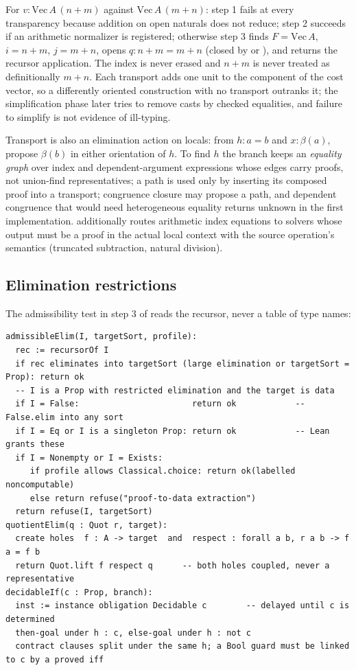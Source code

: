 For $v : \mathrm{Vec}\,A\,(n+m)$ against $\mathrm{Vec}\,A\,(m+n)$: step 1 fails at every transparency because addition on open naturals does not reduce; step 2 succeeds if an arithmetic normalizer is registered; otherwise step 3 finds $F = \mathrm{Vec}\,A$, $i = n+m$, $j = m+n$, opens $q : n+m = m+n$ (closed by  or ), and returns the recursor application. The index is never erased and $n+m$ is never treated as definitionally $m+n$. Each transport adds one unit to the  component of the cost vector, so a differently oriented construction with no transport outranks it; the simplification phase later tries to remove casts by checked equalities, and failure to simplify is not evidence of ill-typing.

Transport is also an elimination action on locals: from $h : a = b$ and $x : \beta(a)$, propose $\beta(b)$ in either orientation of $h$. To find $h$ the branch keeps an \emph{equality graph} over index and dependent-argument expressions whose edges carry proofs, not union-find representatives; a path is used only by inserting its composed proof into a transport; congruence closure may propose a path, and dependent congruence that would need heterogeneous equality returns unknown in the first implementation.  additionally routes arithmetic index equations to solvers whose output must be a proof in the actual local context with the source operation's semantics (truncated subtraction, natural division).

\subsection{Elimination restrictions}\label{alg:elim-restrictions}

The admissibility test in step 3 of  reads the recursor, never a table of type names:

\begin{lstlisting}
admissibleElim(I, targetSort, profile):
  rec := recursorOf I
  if rec eliminates into targetSort (large elimination or targetSort = Prop): return ok
  -- I is a Prop with restricted elimination and the target is data
  if I = False:                       return ok            -- False.elim into any sort
  if I = Eq or I is a singleton Prop: return ok            -- Lean grants these
  if I = Nonempty or I = Exists:
     if profile allows Classical.choice: return ok(labelled noncomputable)
     else return refuse("proof-to-data extraction")
  return refuse(I, targetSort)
quotientElim(q : Quot r, target):
  create holes  f : A -> target  and  respect : forall a b, r a b -> f a = f b
  return Quot.lift f respect q      -- both holes coupled, never a representative
decidableIf(c : Prop, branch):
  inst := instance obligation Decidable c        -- delayed until c is determined
  then-goal under h : c, else-goal under h : not c
  contract clauses split under the same h; a Bool guard must be linked to c by a proved iff
\end{lstlisting}

